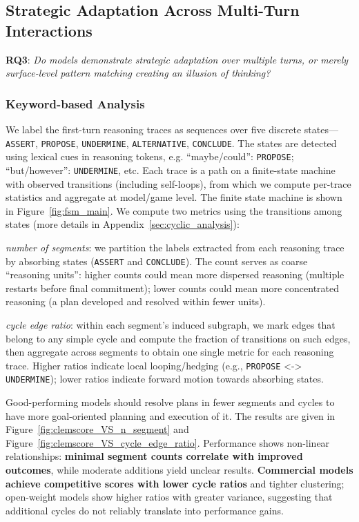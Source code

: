 \documentclass[11pt]{article}
\begin{document}
\subsection{Strategic Adaptation Across Multi-Turn Interactions}

\textbf{RQ3}: \textit{Do models demonstrate strategic adaptation over multiple turns, or merely surface-level pattern matching creating an illusion of thinking?}



\subsubsection{Keyword-based Analysis}
We label the first-turn reasoning traces as sequences over five discrete states—\texttt{ASSERT}, \texttt{PROPOSE}, \texttt{UNDERMINE}, \texttt{ALTERNATIVE}, \texttt{CONCLUDE}. The states are detected using lexical cues in reasoning tokens, e.g. ``maybe/could'': \texttt{PROPOSE}; ``but/however'': \texttt{UNDERMINE}, etc. Each trace is a path on a finite-state machine with observed transitions (including self-loops), from which we compute per-trace statistics and aggregate at model/game level. The finite state machine is shown in Figure~\ref{fig:fsm_main}. We compute two metrics using the transitions among states (more details in Appendix~\ref{sec:cyclic_analysis}):

\textit{number of segments}: we partition the labels extracted from each reasoning trace by absorbing states (\texttt{ASSERT} and  \texttt{CONCLUDE}). The count serves as coarse “reasoning units”: higher counts could mean more dispersed reasoning (multiple restarts before final commitment); lower counts could mean more concentrated reasoning (a plan developed and resolved within fewer units).

\textit{cycle edge ratio}: within each segment’s induced subgraph, we mark edges that belong to any simple cycle and compute the fraction of transitions on such edges, then aggregate across segments to obtain one single metric for each reasoning trace. Higher ratios indicate local looping/hedging (e.g., \texttt{PROPOSE} <-> \texttt{UNDERMINE}); lower ratios indicate forward motion towards absorbing states.

Good-performing models should resolve plans in fewer segments and cycles to have more goal-oriented planning and execution of it. The results are given in Figure~\ref{fig:clemscore_VS_n_segment} and Figure~\ref{fig:clemscore_VS_cycle_edge_ratio}. Performance shows non-linear relationships: \textbf{minimal segment counts correlate with improved outcomes}, while moderate additions yield unclear results. \textbf{Commercial models achieve competitive scores with lower cycle ratios} and tighter clustering; open-weight models show higher ratios with greater variance, suggesting that additional cycles do not reliably translate into performance gains.
\end{document}
